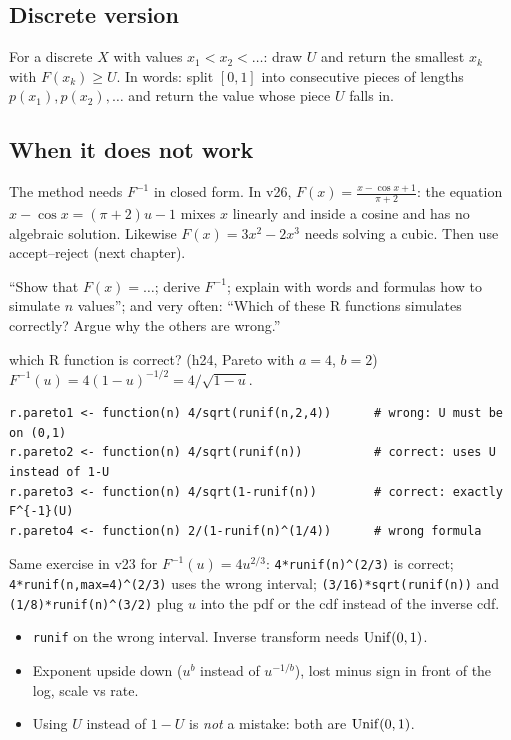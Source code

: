 \subsection{Discrete version}
For a discrete $X$ with values $x_1 < x_2 < \dots$: draw $U$ and return the smallest $x_k$ with $F(x_k) \ge U$. In words: split $[0,1]$ into consecutive pieces of lengths $p(x_1), p(x_2),\dots$ and return the value whose piece $U$ falls in.

\subsection{When it does not work}
The method needs $F^{-1}$ in closed form. In v26, $F(x) = \frac{x-\cos x+1}{\pi+2}$: the equation $x - \cos x = (\pi+2)u - 1$ mixes $x$ linearly and inside a cosine and has no algebraic solution. Likewise $F(x) = 3x^2-2x^3$ needs solving a cubic. Then use accept--reject (next chapter).

\begin{exam}
``Show that $F(x) = \dots$; derive $F^{-1}$; explain with words and formulas how to simulate $n$ values''; and very often: ``Which of these R functions simulates correctly? Argue why the others are wrong.''
\end{exam}

\begin{example}{which R function is correct? (h24, Pareto with $a=4$, $b=2$)}
$F^{-1}(u) = 4(1-u)^{-1/2} = 4/\sqrt{1-u}$.
\begin{Verbatim}
r.pareto1 <- function(n) 4/sqrt(runif(n,2,4))      # wrong: U must be on (0,1)
r.pareto2 <- function(n) 4/sqrt(runif(n))          # correct: uses U instead of 1-U
r.pareto3 <- function(n) 4/sqrt(1-runif(n))        # correct: exactly F^{-1}(U)
r.pareto4 <- function(n) 2/(1-runif(n)^(1/4))      # wrong formula
\end{Verbatim}
Same exercise in v23 for $F^{-1}(u)=4u^{2/3}$: \texttt{4*runif(n)\^{}(2/3)} is correct; \texttt{4*runif(n,max=4)\^{}(2/3)} uses the wrong interval; \texttt{(3/16)*sqrt(runif(n))} and \texttt{(1/8)*runif(n)\^{}(3/2)} plug $u$ into the pdf or the cdf instead of the inverse cdf.
\end{example}

\begin{traps}
\begin{itemize}
  \item \texttt{runif} on the wrong interval. Inverse transform needs $\mathrm{Unif}(0,1)$.
  \item Exponent upside down ($u^{b}$ instead of $u^{-1/b}$), lost minus sign in front of the log, scale vs rate.
  \item Using $U$ instead of $1-U$ is \emph{not} a mistake: both are $\mathrm{Unif}(0,1)$.
\end{itemize}
\end{traps}

